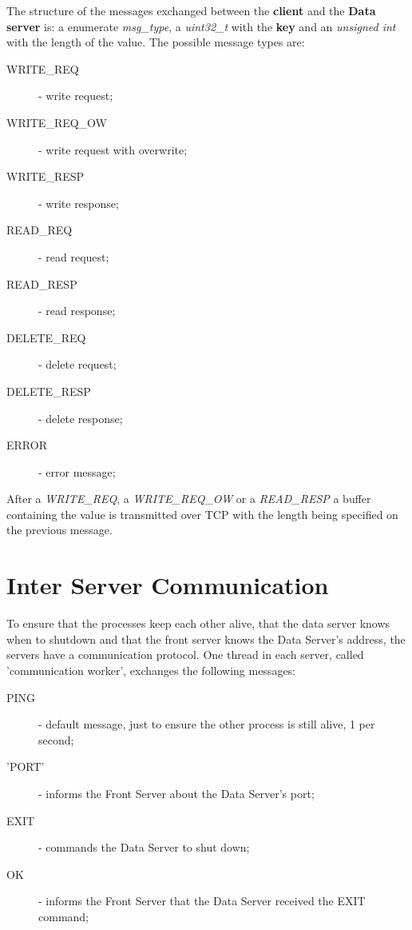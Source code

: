 \documentclass[12pt]{article} %
\begin{document}
The structure of the messages exchanged between the \textbf{client} and the \textbf{Data server}
is:  a  enumerate \emph{msg\_type}, a \emph{uint32\_t} with the \textbf{key} and an \emph{unsigned int}
with the length of the value. The possible message types are:
\begin{description}
    \item[WRITE\_REQ] - write request;
    \item[WRITE\_REQ\_OW] - write request with overwrite;
    \item[WRITE\_RESP] - write response;
    \item[READ\_REQ] - read request;
    \item[READ\_RESP] - read response;
    \item[DELETE\_REQ] - delete request;
    \item[DELETE\_RESP] - delete response;
    \item[ERROR] - error message;
\end{description}
After a \emph{WRITE\_REQ}, a \emph{WRITE\_REQ\_OW} or a \emph{READ\_RESP} a buffer containing
the value is transmitted over TCP with the length being specified on the previous
message.


\section{Inter Server Communication}
\label{sec:CommunicationProtocol}
To ensure that the processes keep each other alive, that the data server knows when
to shutdown and  that the front server knows the Data Server's address, the servers
have a communication protocol. One thread in each server, called 'communication
worker', exchanges the following messages:
  \begin{description}
    \item[PING] - default message, just to ensure the other process is still alive, 1 per second;
    \item['PORT'] - informs the Front Server about the Data Server's port;
    \item[EXIT] - commands the Data Server to shut down;
    \item[OK] - informs the Front Server that the Data Server received the EXIT command;
  \end{description}
\end{document}
